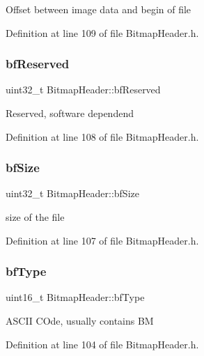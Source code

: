 Offset between image data and begin of file 

Definition at line 109 of file Bitmap\+Header.\+h.

\mbox{\label{classBitmapHeader_abb50b0ca8951540f0bec6fe21b0a7587}} 
\subsubsection{\texorpdfstring{bfReserved}{bfReserved}}
{\footnotesize\ttfamily uint32\+\_\+t Bitmap\+Header\+::bf\+Reserved\hspace{0.3cm}{\ttfamily [private]}}

Reserved, software dependend 

Definition at line 108 of file Bitmap\+Header.\+h.

\mbox{\label{classBitmapHeader_ac27568af32658738302d20edab99bb4b}} 
\subsubsection{\texorpdfstring{bfSize}{bfSize}}
{\footnotesize\ttfamily uint32\+\_\+t Bitmap\+Header\+::bf\+Size\hspace{0.3cm}{\ttfamily [private]}}

size of the file 

Definition at line 107 of file Bitmap\+Header.\+h.

\mbox{\label{classBitmapHeader_a84fd6f0b94fd4f47ddfea7c3439e8531}} 
\subsubsection{\texorpdfstring{bfType}{bfType}}
{\footnotesize\ttfamily uint16\+\_\+t Bitmap\+Header\+::bf\+Type\hspace{0.3cm}{\ttfamily [private]}}

A\+S\+C\+II C\+Ode, usually contains BM 

Definition at line 104 of file Bitmap\+Header.\+h.

\mbox{\label{classBitmapHeader_a27de047b18f59853f385b26b9fd74d20}} 

